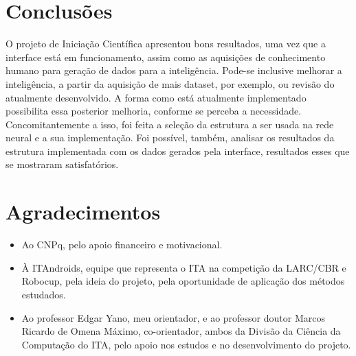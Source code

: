 \documentclass[a4paper,12pt]{article}
\begin{document}
\section{Conclusões}

O projeto de Iniciação Científica apresentou bons resultados, uma vez que a interface está em funcionamento, assim como as aquisições de conhecimento humano para geração de dados para a inteligência. Pode-se inclusive melhorar a inteligência, a partir da aquisição de mais dataset, por exemplo, ou revisão do atualmente desenvolvido. A forma como está atualmente implementado possibilita essa posterior melhoria, conforme se perceba a necessidade. Concomitantemente a isso, foi feita a seleção da estrutura a ser usada na rede neural e a sua implementação. Foi possível, também, analisar os resultados da estrutura implementada com os dados gerados pela interface, resultados esses que se mostraram satisfatórios.

\section{Agradecimentos}

\begin{itemize}
\item Ao CNPq, pelo apoio financeiro e motivacional.
\item À ITAndroids, equipe que representa o ITA na competição da LARC/CBR e Robocup, pela ideia do projeto, pela oportunidade de aplicação dos métodos estudados.
\item Ao professor Edgar Yano, meu orientador, e ao professor doutor Marcos Ricardo de Omena Máximo, co-orientador, ambos da Divisão da Ciência da Computação do ITA, pelo apoio nos estudos e no desenvolvimento do projeto.

\end{itemize}
\end{document}
